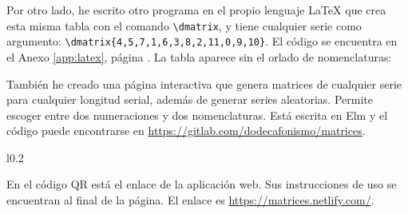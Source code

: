 	
		Por otro lado, he escrito otro programa en el propio lenguaje \LaTeX{} que crea esta misma tabla con el comando \verb|\dmatrix|, y tiene cualquier serie como argumento: \verb|\dmatrix{4,5,7,1,6,3,8,2,11,0,9,10}|. El código se encuentra en el Anexo \ref{app:latex}, página \pageref{app:latex1}. La tabla aparece sin el orlado de nomenclaturas:
	
		
		\bigbreak
		
		También he creado una página interactiva que genera matrices de cualquier serie para cualquier longitud serial, además de generar series aleatorias. Permite escoger entre dos numeraciones y dos nomenclaturas. Está escrita en Elm y el código puede encontrarse en \url{https://gitlab.com/dodecafonismo/matrices}.
		
		\begin{wrapfigure}{l}{0.2\textwidth}
			\vspace{-\bigskipamount}
		\end{wrapfigure} En el código QR está el enlace de la aplicación web. Sus instrucciones de uso se encuentran al final de la página. El enlace es \url{https://matrices.netlify.com/}.
		